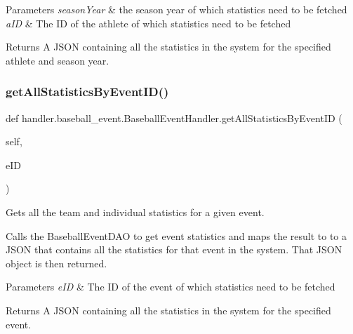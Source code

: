 \begin{DoxyParams}{Parameters}
{\em season\+Year} & the season year of which statistics need to be fetched \\
\hline
{\em a\+ID} & The ID of the athlete of which statistics need to be fetched\\
\hline
\end{DoxyParams}
\begin{DoxyReturn}{Returns}
A J\+S\+ON containing all the statistics in the system for the specified athlete and season year. 
\end{DoxyReturn}
\mbox{\label{classhandler_1_1baseball__event_1_1_baseball_event_handler_a0fbccaf46efe1a468dcd4ff43359c203}} 
\subsubsection{\texorpdfstring{get\+All\+Statistics\+By\+Event\+I\+D()}{getAllStatisticsByEventID()}}
{\footnotesize\ttfamily def handler.\+baseball\+\_\+event.\+Baseball\+Event\+Handler.\+get\+All\+Statistics\+By\+Event\+ID (\begin{DoxyParamCaption}\item[{}]{self,  }\item[{}]{e\+ID }\end{DoxyParamCaption})}



Gets all the team and individual statistics for a given event. 

Calls the Baseball\+Event\+D\+AO to get event statistics and maps the result to to a J\+S\+ON that contains all the statistics for that event in the system. That J\+S\+ON object is then returned.


\begin{DoxyParams}{Parameters}
{\em e\+ID} & The ID of the event of which statistics need to be fetched\\
\hline
\end{DoxyParams}
\begin{DoxyReturn}{Returns}
A J\+S\+ON containing all the statistics in the system for the specified event. 
\end{DoxyReturn}
\mbox{\label{classhandler_1_1baseball__event_1_1_baseball_event_handler_ad49735763de5b2b6be35b8d859c93f87}} 

